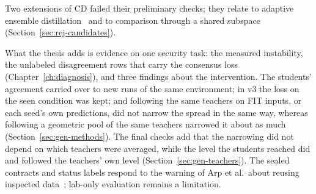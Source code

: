 Two extensions of CD failed their preliminary checks; they relate to
adaptive ensemble distillation~\cite{du2020agree} and to comparison
through a shared subspace~\cite{raghu2017svcca}
(Section~\ref{sec:rej-candidates}).


What the thesis adds is evidence on
one security task: the measured instability, the unlabeled
disagreement rows that carry the consensus loss
(Chapter~\ref{ch:diagnosis}), and three findings about the
intervention. The students' agreement carried over to new runs of the
same environment; in v3 the loss on the seen condition was
kept; and following the same teachers on FIT inputs, or each seed's own
predictions, did not narrow the spread in the same way, whereas
following a geometric pool of the same teachers narrowed it about as
much (Section~\ref{sec:gen-methods}). The final checks add that the
narrowing did not depend on which teachers were averaged, while the
level the students reached did and followed the teachers' own level
(Section~\ref{sec:gen-teachers}). The sealed contracts and status labels respond to the warning of Arp et
al.\ about reusing inspected data~\cite{arp2020dos}; lab-only
evaluation remains a limitation.

